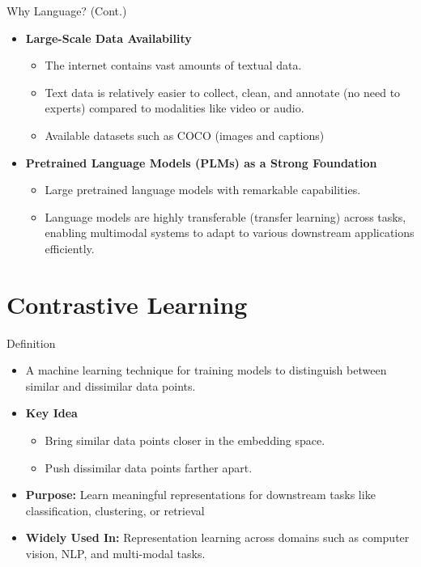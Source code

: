 \documentclass[serif, aspectratio=169]{beamer}
\begin{document}
\begin{frame}{Why Language? (Cont.)}
        \begin{itemize}
          \item \textbf{Large-Scale Data Availability}
          \begin{itemize}
              \item The internet contains vast amounts of textual data.
              \item Text data is relatively easier to collect, clean, and annotate (no need to experts) compared to modalities like video or audio.
              \item Available datasets such as COCO (images and captions)
          \end{itemize}

          \item \textbf{Pretrained Language Models (PLMs) as a Strong Foundation}
          \begin{itemize}
              \item Large pretrained language models with remarkable capabilities.
              \item Language models are highly transferable (transfer learning) across tasks, enabling multimodal systems to adapt to various downstream applications efficiently.
          \end{itemize}
        \end{itemize}
\end{frame}


\section{Contrastive Learning}


\begin{frame}{Definition}
    \begin{itemize}
        \item A machine learning technique for training models to distinguish between similar and dissimilar data points.

        \item \textbf{Key Idea}
        \begin{itemize}
            \item Bring similar data points closer in the embedding space.
            \item Push dissimilar data points farther apart.
        \end{itemize}

        \item \textbf{Purpose:} Learn meaningful representations for downstream tasks like classification, clustering, or retrieval
        \item \textbf{Widely Used In:} Representation learning across domains such as computer vision, NLP, and multi-modal tasks.
    \end{itemize}
\end{frame}
\end{document}
